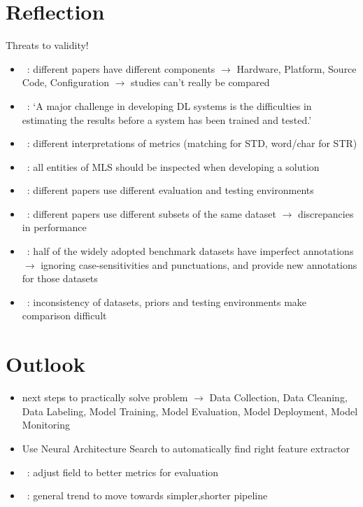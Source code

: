 \section{Reflection}
Threats to validity!
\begin{itemize}
    \item~\cite{arpteg_software_2018}: different papers have different components
        $\rightarrow$ Hardware, Platform, Source Code, Configuration
        $\rightarrow$ studies can't really be compared
    \item~\cite{arpteg_software_2018}: `A major challenge in developing DL systems is the
        difficulties in estimating the results before a system has been trained and tested.'
    \item~\cite{long_scene_2021}: different interpretations of metrics (matching for \ac{STD},
        word/char for \ac{STR})
    \item~\cite{siebert_construction_2021,nakamichi_requirements-driven_2020}: all entities of
        \ac{MLS} should be inspected when developing a solution
    \item~\cite{baek_what_2019}: different papers use different evaluation and testing environments
    \item~\cite{baek_what_2019}: different papers use different subsets of the same dataset
        $\rightarrow$ discrepancies in performance
    \item~\cite{long_unrealtext_2020}: half of the widely adopted benchmark datasets have imperfect
        annotations $\rightarrow$ ignoring case-sensitivities and punctuations, and provide new
        annotations for those datasets
    \item~\cite{chen_text_2021}: inconsistency of datasets, priors and testing environments make
        comparison difficult
\end{itemize}

\section{Outlook}

\begin{itemize}
    \item next steps to practically solve problem $\rightarrow$  Data Collection, Data Cleaning,
        Data Labeling, Model Training, Model Evaluation, Model Deployment, Model
        Monitoring~\citep{watanabe_preliminary_2019}
    \item  Use Neural Architecture Search to automatically find right feature
        extractor~\citep{zhao_improving_2020}
    \item~\cite{shi_icdar2017_2017,he_icpr2018_2018}: adjust field to better metrics for evaluation
    \item~\cite{long_scene_2021}: general trend to move towards simpler,shorter pipeline
\end{itemize}
